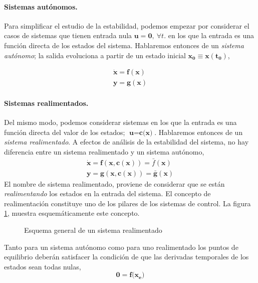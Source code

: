 \paragraph{Sistemas autónomos.} Para simplificar el estudio de la estabilidad, podemos empezar por considerar el casos de sistemas que tienen entrada nula $\mathbf{u} = \mathbf{0}, \ \forall t$. en los que la entrada es una función directa de los estados del sistema. Hablaremos entonces de un \emph{sistema autónomo}; la salida evoluciona a partir de un estado inicial $\mathbf{x_0}\equiv \mathbf{x(t_0)}$,

\begin{align}
\mathbf{\dot{x}} = \mathbf{f}(\mathbf{x})\\
\mathbf{y} = \mathbf{g}(\mathbf{x})
\end{align}

\paragraph{Sistemas realimentados.} Del mismo modo, podemos considerar sistemas en los que la entrada es una función directa del valor de los estados; $\textbf{u}= \textbf{c(x)}$. Hablaremos entonces de un \emph{sistema realimentado}. A efectos de análisis de la estabilidad del sistema, no hay diferencia entre un sistema realimentado y un sistema autónomo,
\begin{align}
\mathbf{\dot{x}} = \mathbf{f}(\mathbf{x},\mathbf{c(x)}) = \bar{f}(\mathbf{x})\\
\mathbf{y} = \mathbf{g}(\mathbf{x},\mathbf{c(x)}) = \bar{\mathbf{g}}(\mathbf{x})
\end{align}
El nombre de sistema realimentado, proviene de considerar que se están \emph{realimentando} los estados en la entrada del sistema. El concepto de realimentación constituye uno de los pilares de los sistemas de control. La figura \ref{fig:rea}, muestra esquemáticamente este concepto.

\begin{figure}
\centering
{}

\caption{Esquema general de un sistema realimentado}\label{fig:rea}
\end{figure}

Tanto para un sistema autónomo como para uno realimentado los puntos de equilibrio deberán satisfacer la condición de que las derivadas temporales de los estados sean todas nulas,
\begin{equation}
\mathbf{0} = \mathbf{f(x_e})
\end{equation}
